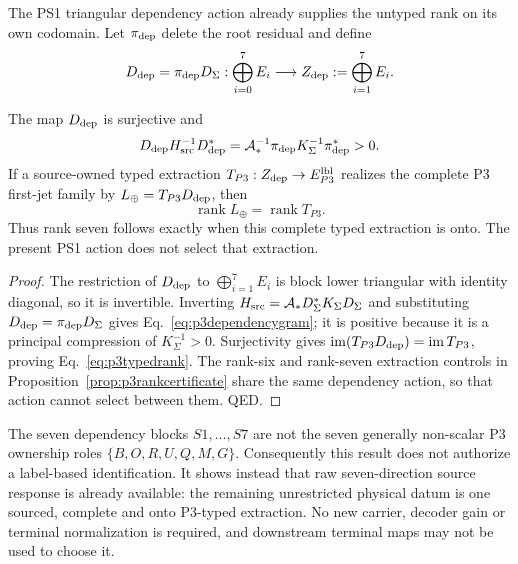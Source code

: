 The PS1 triangular dependency action already supplies the untyped rank on its
own codomain.  Let $\pi_{\rm dep}$ delete the root residual and define
\begin{equation}
D_{\rm dep}=\pi_{\rm dep}D_\Sigma:
\bigoplus_{i=0}^{7}E_i\longrightarrow
Z_{\rm dep}:=\bigoplus_{i=1}^{7}E_i.
\label{eq:p3dependencyoperator}
\end{equation}

\begin{proposition}
\label{prop:p3typedextraction}
The map $D_{\rm dep}$ is surjective and
\begin{equation}
D_{\rm dep}H_{\rm src}^{-1}D_{\rm dep}^*
=\mathcal A_*^{-1}\pi_{\rm dep}K_\Sigma^{-1}\pi_{\rm dep}^*>0.
\label{eq:p3dependencygram}
\end{equation}
If a source-owned typed extraction
$T_{P3}:Z_{\rm dep}\to E_{P3}^{\rm lbl}$ realizes the complete P3 first-jet
family by $L_\oplus=T_{P3}D_{\rm dep}$, then
\begin{equation}
\operatorname{rank}L_\oplus=\operatorname{rank}T_{P3}.
\label{eq:p3typedrank}
\end{equation}
Thus rank seven follows exactly when this complete typed extraction is onto.
The present PS1 action does not select that extraction.
\end{proposition}

\begin{proof}
The restriction of $D_{\rm dep}$ to
$\bigoplus_{i=1}^{7}E_i$ is block lower triangular with identity diagonal,
so it is invertible.  Inverting
$H_{\rm src}=\mathcal A_*D_\Sigma^*K_\Sigma D_\Sigma$ and substituting
$D_{\rm dep}=\pi_{\rm dep}D_\Sigma$ gives
Eq.~\eqref{eq:p3dependencygram}; it is positive because it is a principal
compression of $K_\Sigma^{-1}>0$.  Surjectivity gives
$\operatorname{im}(T_{P3}D_{\rm dep})=\operatorname{im}T_{P3}$, proving
Eq.~\eqref{eq:p3typedrank}.  The rank-six and rank-seven extraction controls
in Proposition~\ref{prop:p3rankcertificate} share the same dependency action,
so that action cannot select between them.  QED.
\end{proof}

The seven dependency blocks $S1,\ldots,S7$ are not the seven generally
non-scalar P3 ownership roles $\{B,O,R,U,Q,M,G\}$.  Consequently this result
does not authorize a label-based identification.  It shows instead that raw
seven-direction source response is already available: the remaining
unrestricted physical datum is one sourced, complete and onto P3-typed
extraction.  No new carrier, decoder gain or terminal normalization is
required, and downstream terminal maps may not be used to choose it.

